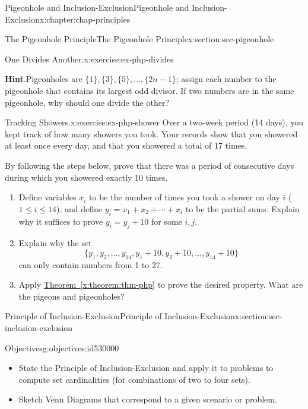 \documentclass[oneside,10pt,]{book}
\newcommand{\blocktitlefont}{\relax}
\newcommand{\xreffont}{\relax}
\numberwithin{equation}{section}
\begin{document}
\begin{chapterptx}{Pigeonhole and Inclusion-Exclusion}{}{Pigeonhole and Inclusion-Exclusion}{}{}{x:chapter:chap-principles}
\begin{sectionptx}{The Pigeonhole Principle}{}{The Pigeonhole Principle}{}{}{x:section:sec-pigeonhole}
\begin{inlineexercise}{One Divides Another.}{x:exercise:ex-php-divides}
\par\smallskip%
\noindent\textbf{\blocktitlefont Hint}.\hypertarget{g:hint:id529950}{}\quad{}Pigeonholes are \(\{1\},\{3\},\{5\},\ldots,\{2n-1\}\); assign each number to the pigeonhole that contains its largest odd divisor. If two numbers are in the same pigeonhole, why should one divide the other?%
\end{inlineexercise}%
\begin{inlineexercise}{Tracking Showers.}{x:exercise:ex-php-shower}%
Over a two-week period (14 days), you kept track of how many showers you took. Your records show that you showered at least once every day, and that you showered a total of 17 times.%
\par
By following the steps below, prove that there was a period of consecutive days during which you showered exactly 10 times.%
\begin{enumerate}[label=(\alph*)]
\item{}Define variables \(x_i\) to be the number of times you took a shower on day \(i\) (\(1 \leq i \leq 14\)), and define \(y_i = x_1 + x_2 + \cdots + x_i\) to be the partial sums. Explain why it suffices to prove \(y_i = y_j + 10\) for some \(i,j\).%
\item{}Explain why the set%
\begin{equation*}
\{y_1,y_2,\ldots,y_{14},y_1+10,y_2+10,\ldots,y_{14}+10\}
\end{equation*}
can only contain numbers from 1 to 27.%
\item{}Apply \hyperref[x:theorem:thm-php]{Theorem~{\xreffont\ref{x:theorem:thm-php}}} to prove the desired property. What are the pigeons and pigeonholes?%
\end{enumerate}
%
\end{inlineexercise}%
\end{sectionptx}
%
%
\typeout{************************************************}
\typeout{************************************************}
%
\begin{sectionptx}{Principle of Inclusion-Exclusion}{}{Principle of Inclusion-Exclusion}{}{}{x:section:sec-inclusion-exclusion}
\begin{objectives}{Objectives}{g:objectives:id530000}
%
\begin{itemize}[label=\textbullet]
\item{}State the Principle of Inclusion-Exclusion and apply it to problems to compute set cardinalities (for combinations of two to four sets).%
\item{}Sketch Venn Diagrams that correspond to a given scenario or problem.%

\end{itemize}
\end{objectives}
\end{sectionptx}
\end{chapterptx}
\end{document}
